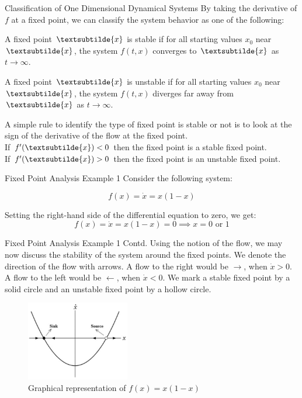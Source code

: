 \documentclass[18pt]{beamer}
\begin{document}
\begin{frame}{Classification of One Dimensional Dynamical Systems}
        By taking the derivative of $f$ at a fixed point, we can classify the system behavior as one of the following:
        \begin{definition}
            A fixed point $\textsubtilde{x}$ is stable if for all starting values $x_0$ near $\textsubtilde{x}$, the system $f(t, x)$ converges to $\textsubtilde{x}$ as $t \rightarrow \infty$.
        \end{definition}
        \begin{definition}
            A fixed point $\textsubtilde{x}$ is unstable if for all starting values $x_0$ near $\textsubtilde{x}$, the system $f(t, x)$ diverges far away from $\textsubtilde{x}$ as $t \rightarrow \infty$.
        \end{definition}
        \pause{}

        A simple rule to identify the type of fixed point is stable or not is to look at the sign of the derivative of the flow at the fixed point.\\
        If $f'(\textsubtilde{x}) < 0$ then the fixed point is a stable fixed point.\\
        If $f'(\textsubtilde{x}) > 0$ then the fixed point is an unstable fixed point.
\end{frame}

\begin{frame}{Fixed Point Analysis Example 1}
    Consider the following system:

    \[f(x) = \dot{x} = x(1-x)\]

    \pause{}
    Setting the right-hand side of the differential equation to zero, we get:
    \[f(x) = \dot{x} = x(1-x) = 0 \implies{x = 0 \text{ or } 1}\]
\end{frame}

\begin{frame}{Fixed Point Analysis Example 1 Contd.}
    Using the notion of the flow, we may now discuss the stability of the system around the fixed points.
    \pause{}
    We denote the direction of the flow with arrows.
    \pause{}
    A flow to the right would be $\rightarrow$, when $\dot{x} > 0$. A flow to the left would be $\leftarrow$, when $\dot{x} < 0$.
    \pause{}
    We mark a stable fixed point by a solid circle and an unstable fixed point by a hollow circle.
    \begin{figure}[t]
        \centering
        \includegraphics[width=0.4\textwidth]{stability1}
        \caption{Graphical representation of $f(x) = x(1-x)$}
    \end{figure}

\end{frame}
\end{document}
